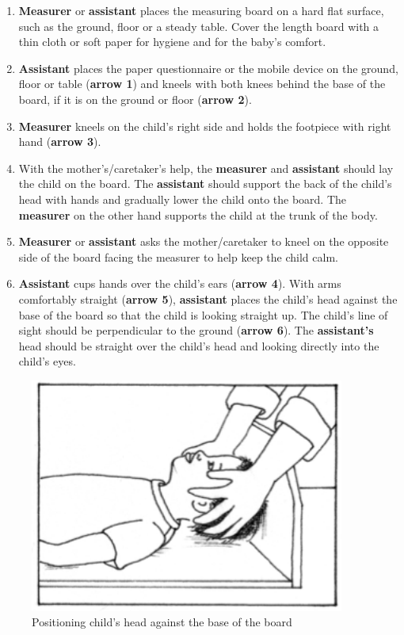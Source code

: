 \documentclass[12pt,]{book}
\theoremstyle{definition}
\theoremstyle{definition}
\theoremstyle{definition}
\theoremstyle{remark}
\begin{document}
\begin{enumerate}
\def\labelenumi{\arabic{enumi}.}
\item
  \textbf{Measurer} or \textbf{assistant} places the measuring board on
  a hard flat surface, such as the ground, floor or a steady table.
  Cover the length board with a thin cloth or soft paper for hygiene and
  for the baby's comfort.
\item
  \textbf{Assistant} places the paper questionnaire or the mobile device
  on the ground, floor or table (\textbf{arrow 1}) and kneels with both
  knees behind the base of the board, if it is on the ground or floor
  (\textbf{arrow 2}).
\item
  \textbf{Measurer} kneels on the child's right side and holds the
  footpiece with right hand (\textbf{arrow 3}).
\item
  With the mother's/caretaker's help, the \textbf{measurer} and
  \textbf{assistant} should lay the child on the board. The
  \textbf{assistant} should support the back of the child's head with
  hands and gradually lower the child onto the board. The
  \textbf{measurer} on the other hand supports the child at the trunk of
  the body.
\item
  \textbf{Measurer} or \textbf{assistant} asks the mother/caretaker to
  kneel on the opposite side of the board facing the measurer to help
  keep the child calm.
\item
  \textbf{Assistant} cups hands over the child's ears (\textbf{arrow
  4}). With arms comfortably straight (\textbf{arrow 5}),
  \textbf{assistant} places the child's head against the base of the
  board so that the child is looking straight up. The child's line of
  sight should be perpendicular to the ground (\textbf{arrow 6}). The
  \textbf{assistant's} head should be straight over the child's head and
  looking directly into the child's eyes.
\end{enumerate}

\begin{figure}

{\centering \includegraphics[width=4.07in]{images/heightBoard05} 

}

\caption{Positioning child's head against the base of the board}\label{fig:height08}
\end{figure}
\end{document}

